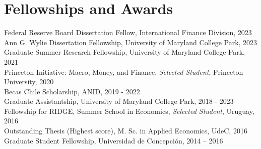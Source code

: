 \documentclass[11pt]{article}
\begin{document}
\section*{Fellowships and Awards}
Federal Reserve Board  Dissertation Fellow, International Finance Division, 2023\\
Ann G. Wylie Dissertation Fellowship, University of Maryland College Park, 2023  \\
Graduate Summer Research Fellowship, University of Maryland College Park, 2021\\
Princeton Initiative: Macro, Money, and Finance, \emph{Selected Student}, Princeton University, 2020\\
Becas Chile Scholarship, ANID, 2019 - 2022\\
Graduate Assistantship, University of Maryland College Park, 2018 - 2023\\
Fellowship for RIDGE, Summer School in Economics, \emph{Selected Student}, Uruguay, 2016\\
Outstanding Thesis (Highest score), M. Sc. in Applied Economics, UdeC, 2016\\
Graduate Student Fellowship, Universidad de Concepci\'on, 2014 -- 2016

\iffalse
\section*{Datasets}

``\emph{Chilean Economic Uncertainty Index}", which tracks economic uncertainty in the Chilean economy. Reported monthly by \href{http://www.clapesuc.cl/indicador/indice-de-incertidumbre-economica-iiec/}{CLAPES UC}.\\
``\emph{Chilean Economic Policy Uncertainty Index}", which tracks economic policy uncertainty in the Chilean economy. Reported monthly at the \href{http://www.policyuncertainty.com/chile_monthly.html}{Economic Policy Uncertainty} website managed by Scott Baker (Northwestern-Kellogg), Nicholas Bloom (Stanford) and Steve Davis (Chicago-Booth).
\fi


\end{document}
